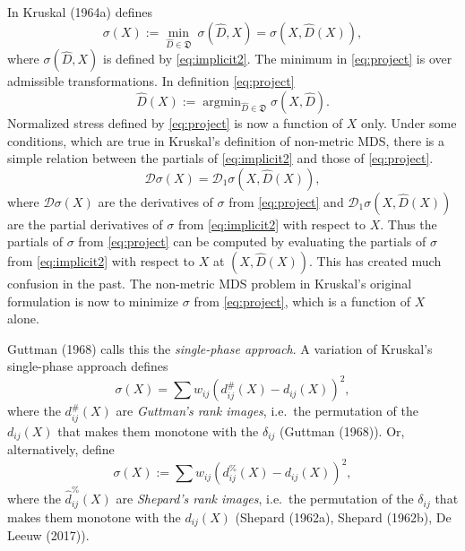 \documentclass[
  12pt,
]{article}
\begin{document}
In Kruskal (1964a) defines
\begin{equation}
\sigma(X):=\min_{\hat D\in\mathfrak{D}}\ \sigma(\hat D,X)=\sigma(X,\hat D(X)),
\label{eq:project}
\end{equation}
where \(\sigma(\hat D,X)\) is defined by
\eqref{eq:implicit2}. The minimum in \eqref{eq:project} is over admissible
transformations. In definition \eqref{eq:project}
\begin{equation}
\hat D(X):=\mathop{\text{argmin}}_{\hat D\in\mathfrak{D}}\sigma(X, \hat D).
\label{eq:optscal}
\end{equation}
Normalized stress defined by \eqref{eq:project} is now a
function of \(X\) only. Under some conditions, which are true in Kruskal's
definition of non-metric MDS, there is a simple relation between the
partials of \eqref{eq:implicit2} and those of \eqref{eq:project}.
\begin{equation}
\mathcal{D}\sigma(X)=\mathcal{D}_1\sigma(X,\hat D(X)),
\label{eq:partials}
\end{equation}
where \(\mathcal{D}\sigma(X)\) are the derivatives of
\(\sigma\) from \eqref{eq:project} and \(\mathcal{D}_1\sigma(X,\hat D(X))\)
are the partial derivatives of \(\sigma\) from \eqref{eq:implicit2} with
respect to \(X\). Thus the partials of \(\sigma\) from \eqref{eq:project} can
be computed by evaluating the partials of \(\sigma\) from
\eqref{eq:implicit2} with respect to \(X\) at \((X,\hat D(X))\). This has
created much confusion in the past. The non-metric MDS problem in Kruskal's original formulation is now to
minimize \(\sigma\) from \eqref{eq:project}, which is a function of \(X\)
alone.

Guttman (1968) calls this the \emph{single-phase approach}. A variation of
Kruskal's single-phase approach defines
\begin{equation}
\sigma(X)=\sum w_{ij}(d_{ij}^\#(X)-d_{ij}(X))^2,
\label{eq:rankimage}
\end{equation}
where the \(d_{ij}^\#(X)\) are \emph{Guttman's rank images}, i.e.~the
permutation of the \(d_{ij}(X)\) that makes them monotone with the
\(\delta_{ij}\) (Guttman (1968)). Or, alternatively, define
\begin{equation}
\sigma(X):=\sum   w_{ij}(d_{ij}^\%(X)-d_{ij}(X))^2,
\label{eq:shepard}
\end{equation}
where the \(\hat d_{ij}^\%(X)\) are \emph{Shepard's rank images}, i.e.~the
permutation of the \(\delta_{ij}\) that makes them monotone with the
\(d_{ij}(X)\) (Shepard (1962a), Shepard (1962b), De Leeuw (2017)).
\end{document}
